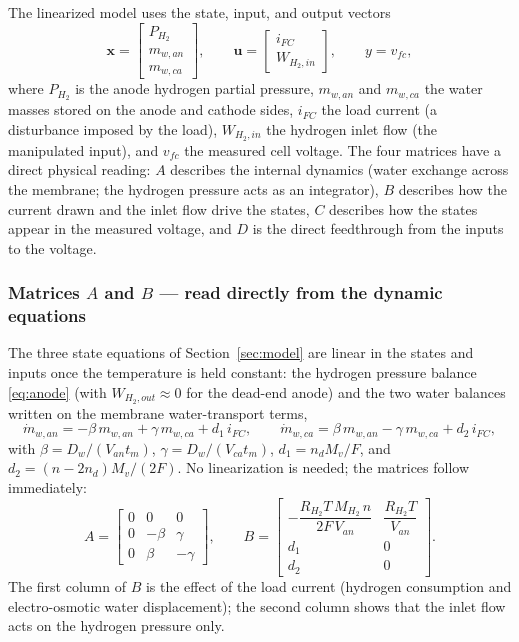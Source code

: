 The linearized model uses the state, input, and output vectors
\begin{equation*}
    \mathbf{x} = \begin{bmatrix} P_{H_2} \\ m_{w,an} \\ m_{w,ca} \end{bmatrix},
    \qquad
    \mathbf{u} = \begin{bmatrix} i_{FC} \\ W_{H_2,in} \end{bmatrix},
    \qquad
    y = v_{fc},
\end{equation*}
where $P_{H_2}$ is the anode hydrogen partial pressure, $m_{w,an}$ and $m_{w,ca}$
the water masses stored on the anode and cathode sides, $i_{FC}$ the load current
(a disturbance imposed by the load), $W_{H_2,in}$ the hydrogen inlet flow (the
manipulated input), and $v_{fc}$ the measured cell voltage. The four matrices
have a direct physical reading: $A$ describes the internal dynamics (water
exchange across the membrane; the hydrogen pressure acts as an integrator), $B$
describes how the current drawn and the inlet flow drive the states, $C$
describes how the states appear in the measured voltage, and $D$ is the direct
feedthrough from the inputs to the voltage.

\subsubsection*{Matrices $A$ and $B$ --- read directly from the dynamic equations}
The three state equations of Section~\ref{sec:model} are linear in the states and
inputs once the temperature is held constant: the hydrogen pressure balance
\eqref{eq:anode} (with $W_{H_2,out}\approx 0$ for the dead-end anode) and the two
water balances written on the membrane water-transport terms,
\begin{equation*}
    \dot{m}_{w,an} = -\beta\, m_{w,an} + \gamma\, m_{w,ca} + d_1\, i_{FC},
    \qquad
    \dot{m}_{w,ca} = \beta\, m_{w,an} - \gamma\, m_{w,ca} + d_2\, i_{FC},
\end{equation*}
with
$\beta = D_w/(V_{an}t_m)$, $\gamma = D_w/(V_{ca}t_m)$,
$d_1 = n_d M_v/F$, and $d_2 = (n-2n_d)M_v/(2F)$.
No linearization is needed; the matrices follow immediately:
\begin{equation}
    A =
    \begin{bmatrix}
        0 & 0 & 0\\[2pt]
        0 & -\beta & \gamma\\[2pt]
        0 & \beta & -\gamma
    \end{bmatrix},
    \qquad
    B =
    \begin{bmatrix}
        -\dfrac{R_{H_2}T\,M_{H_2}\,n}{2F\,V_{an}} & \dfrac{R_{H_2}T}{V_{an}}\\[8pt]
        d_1 & 0\\[2pt]
        d_2 & 0
    \end{bmatrix}.
    \label{eq:AB}
\end{equation}
The first column of $B$ is the effect of the load current (hydrogen consumption
and electro-osmotic water displacement); the second column shows that the inlet
flow acts on the hydrogen pressure only.

